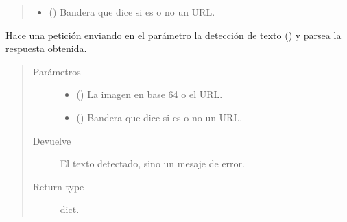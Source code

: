 \begin{fulllineitems}
\begin{fulllineitems}
\begin{quote}
\begin{description}
\begin{itemize}
\item {} 
 () \textendash{} Bandera que dice si es o no un URL.

\end{itemize}

\end{description}\end{quote}

\end{fulllineitems}


\begin{fulllineitems}
\label{\detokenize{chapter_two/desc_cloudnao:app.tpa_client_libraries.google_cloud_vision.GoogleCloudVision.text_annotations_description}}
Hace una petición enviando en el parámetro  la detección
de texto ()
y parsea la respuesta obtenida.
\begin{quote}\begin{description}
\item[{Parámetros}] \leavevmode\begin{itemize}
\item {} 
 () \textendash{} La imagen en base 64 o el URL.

\item {} 
 () \textendash{} Bandera que dice si es o no un URL.

\end{itemize}

\item[{Devuelve}] \leavevmode
El texto detectado, sino un mesaje de error.

\item[{Return type}] \leavevmode
dict.

\end{description}\end{quote}

\end{fulllineitems}


\end{fulllineitems}

\label{\detokenize{chapter_two/desc_cloudnao:module-app.tpa_client_libraries.kairos_client}}\label{\detokenize{chapter_two/desc_cloudnao:module-kairos}}

